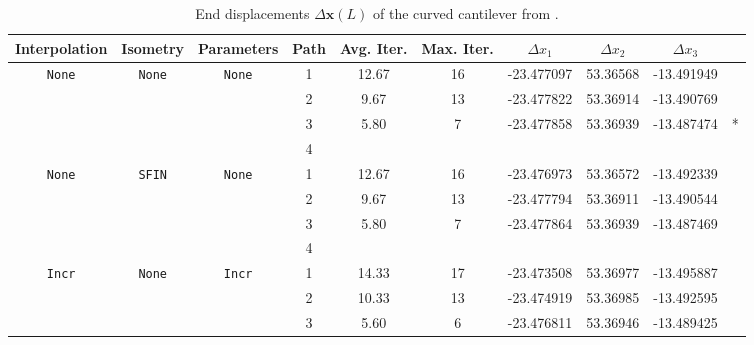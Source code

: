 
%
%
%
\begin{center}
\begin{table}%
\caption{End displacements \(\Delta \boldsymbol{x}(L)\) of the curved cantilever from \cite{bathe1979large}.}
\label{tab:bathe02}
\begin{tabular*}{\textwidth}{@{\extracolsep\fill}cccccccccc@{}}
\toprule
\textbf{Interpolation} & \textbf{Isometry} & \textbf{Parameters} &
\textbf{Path} & \textbf{Avg. Iter.} & \textbf{Max. Iter.} &
  \(\Delta x_1\) & \(\Delta x_2\) & \(\Delta x_3\)
\\ %
\midrule
  \texttt{None} & \texttt{None} & \texttt{None}  & 1 &      12.67  & 16   & -23.477097 &  53.36568 &  -13.491949  \\
                &               &                & 2 &       9.67  & 13   & -23.477822 &  53.36914 &  -13.490769  & \cite{simo1986threedimensional} \\
                &               &                & 3 &       5.80  &  7   & -23.477858 &  53.36939 &  -13.487474  & \cite{ibrahimbegovic2002role}* \\
                &               &                & 4 \\                                            
  \hline                                                                                           
  \texttt{None} & \texttt{SFIN} & \texttt{None}  & 1 &      12.67   & 16 &  -23.476973 &  53.36572 &  -13.492339  \\
                &               &                & 2 &       9.67   & 13 &  -23.477794 &  53.36911 &  -13.490544  \\
                &               &                & 3 &       5.80   &  7 &  -23.477864 &  53.36939 &  -13.487469  \\
                &               &                & 4 \\                                            
  \hline                                                                                           
  \texttt{Incr} & \texttt{None} & \texttt{Incr}  & 1 &      14.33   & 17 &  -23.473508 &  53.36977 &  -13.495887    \\ %
                &               &                & 2 &      10.33   & 13 &  -23.474919 &  53.36985 &  -13.492595    \\
                &               &                & 3 &       5.60   &  6 &  -23.476811 &  53.36946 &  -13.489425  & \cite{ibrahimbegovic2002role} \\

\end{tabular*}
\end{table}
\end{center}
